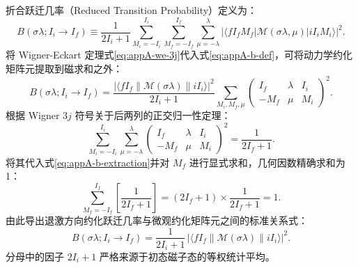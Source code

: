 折合跃迁几率（Reduced Transition Probability）定义为：
\begin{equation}\label{eq:appA-b-def}
B(\sigma\lambda; I_i \to I_f) \equiv \frac{1}{2I_i + 1} \sum_{M_i=-I_i}^{I_i} \sum_{M_f=-I_f}^{I_f} \sum_{\mu=-\lambda}^\lambda |\langle f I_f M_f | \mathcal{M}(\sigma\lambda, \mu) | i I_i M_i \rangle|^2 .
\end{equation}
将 Wigner-Eckart 定理式\eqref{eq:appA-we-3j}代入式\eqref{eq:appA-b-def}，可将动力学约化矩阵元提取到磁求和之外：
\begin{equation}\label{eq:appA-b-extraction}
B(\sigma\lambda; I_i \to I_f) = \frac{|\langle f I_f \| \mathcal{M}(\sigma\lambda) \| i I_i \rangle|^2}{2I_i + 1} \sum_{M_i, M_f, \mu} \begin{pmatrix} I_f & \lambda & I_i \\ -M_f & \mu & M_i \end{pmatrix}^2 .
\end{equation}
根据 Wigner $3j$ 符号关于后两列的正交归一性定理：
\begin{equation}\label{eq:appA-3j-ortho-sum}
\sum_{M_i=-I_i}^{I_i} \sum_{\mu=-\lambda}^\lambda \begin{pmatrix} I_f & \lambda & I_i \\ -M_f & \mu & M_i \end{pmatrix}^2 = \frac{1}{2I_f + 1} .
\end{equation}
将其代入式\eqref{eq:appA-b-extraction}并对 $M_f$ 进行显式求和，几何因数精确求和为 1：
\begin{equation}\label{eq:appA-b-sum-unity}
\sum_{M_f=-I_f}^{I_f} \left[ \frac{1}{2I_f + 1} \right] = (2I_f + 1) \times \frac{1}{2I_f + 1} = 1 .
\end{equation}
由此导出退激方向约化跃迁几率与微观约化矩阵元之间的标准关系式：
\begin{equation}\label{eq:appA-b-standard-down}
B(\sigma\lambda; I_i \to I_f) = \frac{1}{2I_i + 1} \, |\langle f I_f \| \mathcal{M}(\sigma\lambda) \| i I_i \rangle|^2 .
\end{equation}
分母中的因子 $2I_i + 1$ 严格来源于初态磁子态的等权统计平均。

